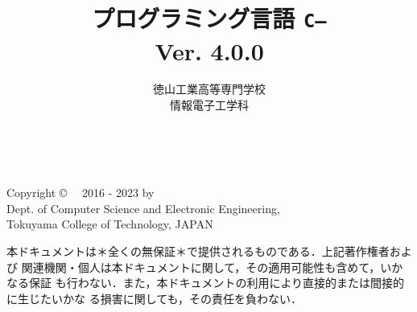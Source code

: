 \documentclass[a4paper,11pt,twocolumn]{ltjsbook}   %
\newcommand{\ver}{Ver. 4.0.0}
\newcommand{\cmm}{{\tt C--}}
\begin{document}
\setlength{\oddsidemargin}{10pt}
\setlength{\evensidemargin}{-10pt}
\setlength{\headsep}{1cm}
\frontmatter

\title{プログラミング言語 \cmm \\\ver}
\author{徳山工業高等専門学校\\情報電子工学科}
\date{}

\maketitle

\thispagestyle{empty}
\onecolumn
~
\vfill
\begin{flushleft}
Copyright \copyright ~~ 2016 - 2023 by \\
Dept. of Computer Science and Electronic Engineering, \\
Tokuyama College of Technology, JAPAN
\end{flushleft}

\vspace{0.8cm}

本ドキュメントは＊全くの無保証＊で提供されるものである．上記著作権者および
関連機関・個人は本ドキュメントに関して，その適用可能性も含めて，いかなる保証
も行わない．また，本ドキュメントの利用により直接的または間接的に生じたいかな
る損害に関しても，その責任を負わない．
\setcounter{page}{0}

\tableofcontents

\mainmatter
\onecolumn

\appendix

\backmatter
\pagestyle{empty}
\onecolumn
~
\end{document}
